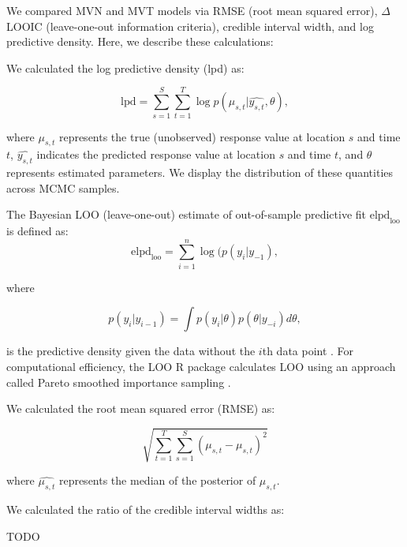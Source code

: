 \documentclass[12pt,english]{article}
\begin{document}
\begin{spacing}{1.2}
We compared MVN and MVT models via RMSE (root mean squared error), $\Delta$
LOOIC (leave-one-out information criteria), credible interval width,
and log predictive density. Here, we describe these calculations:

We calculated the log predictive density (lpd) as:

\begin{equation}
  \mathrm{lpd} = \sum^{S}_{s=1}{ \sum^{T}_{t=1}{ \log  p(\mu_{s,t} | \widehat{y_{s,t}}, \theta)}},
\end{equation}

\noindent where $\mu_{s,t}$ represents the true (unobserved) response value at
location $s$ and time $t$, $\widehat{y_{s,t}}$ indicates the predicted
response value at location $s$ and time $t$, and $\theta$ represents estimated
parameters. We display the distribution of these quantities across MCMC
samples.

The Bayesian LOO (leave-one-out) estimate of out-of-sample
predictive fit $\mathrm{elpd}_\mathrm{loo}$ is defined as:
\begin{equation}
  \mathrm{elpd}_\mathrm{loo} = \sum^{n}_{i=1}{\log ( p(y_i | y_{-1}) },
\end{equation}

\noindent where

\begin{equation}
  p(y_i | y_{i-1}) = \int p(y_i | \theta) p (\theta | y_{-i}) d \theta ,
\end{equation}

\noindent is the predictive density given the data without the $i$th data
point \citep{vehtari2016}. For computational efficiency, the LOO R package
calculates LOO using an approach called Pareto smoothed importance sampling
\citep{vehtari2016}.

We calculated the root mean squared error (RMSE) as:

\begin{equation}
  \sqrt{ \sum^{T}_{t=1}{ \sum^{S}_{s=1}{ (\mu_{s,t} - \widehat{ \mu_{s,t} })^2 } } }
\end{equation}

\noindent where $\widehat{\mu_{s,t}}$ represents the median of the posterior
of $\mu_{s,t}$.

We calculated the ratio of the credible interval widths as:

TODO

\clearpage

\end{spacing}
\end{document}
